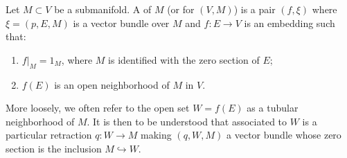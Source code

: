 Let $M \subset V$ be a submanifold. A  of $M$ (or for $(V,M)$) is a pair $(f,\xi)$ where $\xi = (p,E,M)$ is a vector bundle over $M$ and $f: E \rightarrow V$ is an embedding such that:
\begin{enumerate}
\item $f|_M = 1_M$, where $M$ is identified with the zero section of $E$;
\item $f(E)$ is an open neighborhood of $M$ in $V$.
\end{enumerate}
More loosely, we often refer to the open set $W = f(E)$ as a tubular neighborhood of $M$. It is then to be understood that associated to $W$ is a particular retraction $q: W \rightarrow M$ making $(q,W,M)$ a vector bundle whose zero section is the inclusion $M \hookrightarrow W$.
